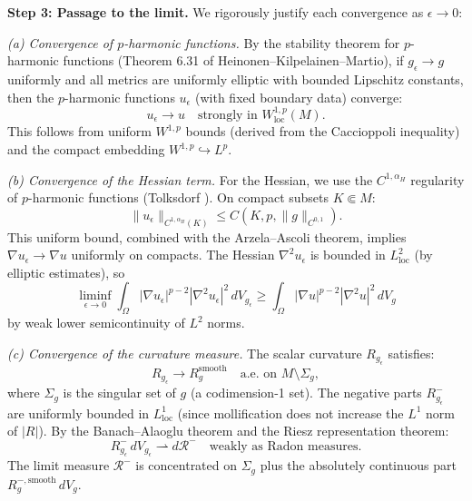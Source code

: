 \textbf{Step 3: Passage to the limit.}
We rigorously justify each convergence as $\epsilon \to 0$:

\textit{(a) Convergence of $p$-harmonic functions.} By the stability theorem for $p$-harmonic functions (Theorem 6.31 of Heinonen--Kilpelainen--Martio), if $g_\epsilon \to g$ uniformly and all metrics are uniformly elliptic with bounded Lipschitz constants, then the $p$-harmonic functions $u_\epsilon$ (with fixed boundary data) converge:
\begin{equation}
    u_\epsilon \to u \quad \text{strongly in } W^{1,p}_{\mathrm{loc}}(M).
\end{equation}
This follows from uniform $W^{1,p}$ bounds (derived from the Caccioppoli inequality) and the compact embedding $W^{1,p} \hookrightarrow L^p$.

\textit{(b) Convergence of the Hessian term.} For the Hessian, we use the $C^{1,\alpha_H}$ regularity of $p$-harmonic functions (Tolksdorf \cite{tolksdorf1984}). On compact subsets $K \Subset M$:
\begin{equation}
    \|u_\epsilon\|_{C^{1,\alpha_H}(K)} \le C(K, p, \|g\|_{C^{0,1}}).
\end{equation}
This uniform bound, combined with the Arzela--Ascoli theorem, implies $\nabla u_\epsilon \to \nabla u$ uniformly on compacts. The Hessian $\nabla^2 u_\epsilon$ is bounded in $L^2_{\mathrm{loc}}$ (by elliptic estimates), so
\begin{equation}
    \liminf_{\epsilon \to 0} \int_\Omega |\nabla u_\epsilon|^{p-2} |\nabla^2 u_\epsilon|^2 \, dV_{g_\epsilon} \ge \int_\Omega |\nabla u|^{p-2} |\nabla^2 u|^2 \, dV_g
\end{equation}
by weak lower semicontinuity of $L^2$ norms.

\textit{(c) Convergence of the curvature measure.} The scalar curvature $R_{g_\epsilon}$ satisfies:
\begin{equation}
    R_{g_\epsilon} \to R_g^{\text{smooth}} \quad \text{a.e. on } M \setminus \Sigma_g,
\end{equation}
where $\Sigma_g$ is the singular set of $g$ (a codimension-1 set). The negative parts $R_{g_\epsilon}^-$ are uniformly bounded in $L^1_{\mathrm{loc}}$ (since mollification does not increase the $L^1$ norm of $|R|$). By the Banach--Alaoglu theorem and the Riesz representation theorem:
\begin{equation}
    R_{g_\epsilon}^- \, dV_{g_\epsilon} \rightharpoonup d\mathcal{R}^- \quad \text{weakly as Radon measures}.
\end{equation}
The limit measure $\mathcal{R}^-$ is concentrated on $\Sigma_g$ plus the absolutely continuous part $R_g^{-,\text{smooth}} \, dV_g$.

